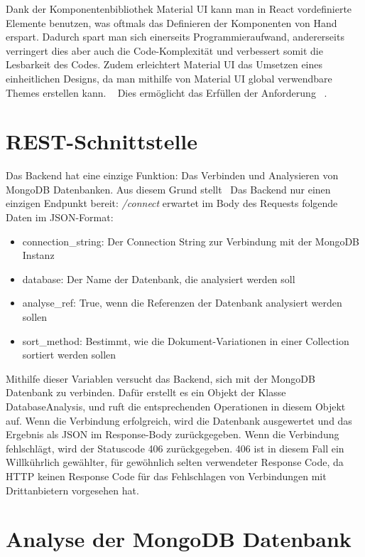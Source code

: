 Dank der Komponentenbibliothek Material UI kann man in React vordefinierte Elemente benutzen, was oftmals das Definieren der Komponenten von Hand erspart.
Dadurch spart man sich einerseits Programmieraufwand, andererseits verringert dies aber auch die Code-Komplexität und verbessert somit die Lesbarkeit des Codes.
Zudem erleichtert Material UI das Umsetzen eines einheitlichen Designs, da man mithilfe von Material UI global verwendbare Themes erstellen kann.
~\autocite{mui:mui}
Dies ermöglicht das Erfüllen der Anforderung ~.

\section{REST-Schnittstelle}
\label{sec:rest_schnittstelle}
Das Backend hat eine einzige Funktion:
Das Verbinden und Analysieren von MongoDB Datenbanken.
Aus diesem Grund stellt ~Das Backend nur einen einzigen Endpunkt bereit: 
\textit{/connect} erwartet im Body des Requests folgende Daten im JSON-Format:
\begin{itemize}
    \item connection\_string: Der Connection String zur Verbindung mit der MongoDB Instanz
    \item database: Der Name der Datenbank, die analysiert werden soll
    \item analyse\_ref: True, wenn die Referenzen der Datenbank analysiert werden sollen
    \item sort\_method: Bestimmt, wie die Dokument-Variationen in einer Collection sortiert werden sollen
\end{itemize}
Mithilfe dieser Variablen versucht das Backend, sich mit der MongoDB Datenbank zu verbinden.
Dafür erstellt es ein Objekt der Klasse DatabaseAnalysis, und ruft die entsprechenden Operationen in diesem Objekt auf.
Wenn die Verbindung erfolgreich, wird die Datenbank ausgewertet und das Ergebnis als JSON im Response-Body zurückgegeben.
Wenn die Verbindung fehlschlägt, wird der Statuscode 406 zurückgegeben.
406 ist in diesem Fall ein Willkührlich gewählter, für gewöhnlich selten verwendeter Response Code, da HTTP keinen Response Code für das Fehlschlagen von Verbindungen mit Drittanbietern vorgesehen hat.

\section{Analyse der MongoDB Datenbank}
\label{sec:mongoDB_analyse}

